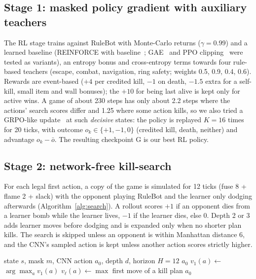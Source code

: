 \documentclass[runningheads]{llncs}
\begin{document}
\subsection{Stage 1: masked policy gradient with auxiliary teachers}
The RL stage trains against RuleBot with Monte-Carlo returns ($\gamma=0.99$) and a learned baseline (REINFORCE with baseline~\cite{williams1992reinforce}; GAE~\cite{schulman2016gae} and PPO clipping~\cite{schulman2017ppo} were tested as variants), an entropy bonus and cross-entropy terms towards four rule-based teachers (escape, combat, navigation, ring safety; weights 0.5, 0.9, 0.4, 0.6). Rewards are event-based ($+4$ per credited kill, $-1$ on death, $-1.5$ extra for a self-kill, small item and wall bonuses); the $+10$ for being last alive is kept only for active wins. A game of about 230 steps has only about 2.2 steps where the actions' search scores differ and 1.25 where some action kills, so we also tried a GRPO-like update~\cite{shao2024grpo} at such \emph{decisive} states: the policy is replayed $K=16$ times for 20 ticks, with outcome $o_k\in\{+1,-1,0\}$ (credited kill, death, neither) and advantage $o_k-\bar o$. The resulting checkpoint G is our best RL policy.

\subsection{Stage 2: network-free kill-search}
For each legal first action, a copy of the game is simulated for 12 ticks (fuse 8 + flame 2 + slack) with the opponent playing RuleBot and the learner only dodging afterwards (Algorithm~\ref{alg:search}). A rollout scores $+1$ if an opponent dies from a learner bomb while the learner lives, $-1$ if the learner dies, else 0. Depth 2 or 3 adds learner moves before dodging and is expanded only when no shorter plan kills. The search is skipped unless an opponent is within Manhattan distance 6, and the CNN's sampled action is kept unless another action scores strictly higher.

\begin{algorithm}[t]
\caption{Kill-search of depth $d$ (play time)}
\label{alg:search}
\small
\begin{algorithmic}[1]
\Require state $s$, mask $m$, CNN action $a_0$, depth $d$, horizon $H=12$
 \Return $a_0$ \EndIf
{}
  \State $v_1(a)\gets$  
\EndFor
{} \Return $\arg\max_a v_1(a)$ \EndIf
{} 
    \State $v_\ell(a)\gets\max$ 
  \EndFor
   \Return first move of a kill plan \EndIf
\EndFor
\State \Return $a_0$
\end{algorithmic}
\end{algorithm}
\end{document}
